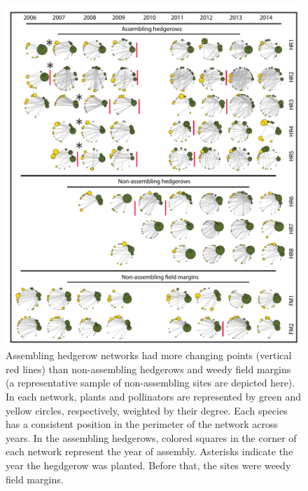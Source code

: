 \documentclass[12pt]{article}
\begin{document}





\begin{figure}
  \centering
  \includegraphics[width=1\textwidth]{../analysis/changePoint/plotting/networksv1.pdf}
  \caption{Assembling hedgerow networks had more changing points
    (vertical red lines) than non-assembling hedgerows and weedy field
    margins (a representative sample of non-assembling sites are
    depicted here). In each network, plants and pollinators are
    represented by green and yellow circles, respectively, weighted by
    their degree. Each species has a consistent position in the
    perimeter of the network across years. In the assembling
    hedgerows, colored squares in the corner of each network represent
    the year of assembly. Asterisks indicate the year the hegdgerow
    was planted. Before that, the sites were weedy field margins.}
  \label{fig:changePoints}
\end{figure}
\clearpage
\end{document}

